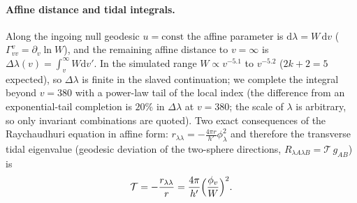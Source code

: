 \documentclass[11pt]{article}
\begin{document}
\paragraph{Affine distance and tidal integrals.} Along the ingoing null geodesic $u=\mathrm{const}$ the affine parameter is $\mathrm d\lambda=W\,\mathrm dv$ ($\Gamma^{v}_{vv}=\partial_v\ln W$), and the remaining affine distance to $v=\infty$ is $\Delta\lambda(v)=\int_v^\infty W\mathrm dv'$. In the simulated range $W\propto v^{-5.1}$ to $v^{-5.2}$ ($2k+2=5$ expected), so $\Delta\lambda$ is finite in the slaved continuation; we complete the integral beyond $v=380$ with a power-law tail of the local index (the difference from an exponential-tail completion is $20\%$ in $\Delta\lambda$ at $v=380$; the scale of $\lambda$ is arbitrary, so only invariant combinations are quoted). Two exact consequences of the Raychaudhuri equation in affine form: $r_{\lambda\lambda}=-\tfrac{4\pi r}{h'}\phi_\lambda^{2}$ and therefore the transverse tidal eigenvalue (geodesic deviation of the two-sphere directions, $R_{\lambda A\lambda B}=\mathcal T\,g_{AB}$) is
\begin{equation}
\mathcal T=-\frac{r_{\lambda\lambda}}r=\frac{4\pi}{h'}\Bigl(\frac{\phi_v}{W}\Bigr)^{2}.
\label{eq:tidal}
\end{equation}
\end{document}

